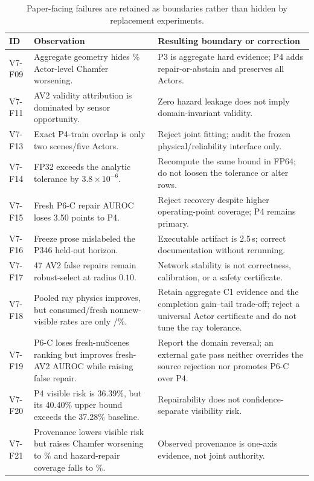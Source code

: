 \begin{table}[h]
\centering
\small
\caption{Paper-facing failures are retained as boundaries rather than hidden by replacement experiments.}
\begin{tabular}{p{}p{}p{}}
\toprule
ID & Observation & Resulting boundary or correction \\
\midrule
V7-F09 & Aggregate geometry hides \PthreeActorWorse{}\% Actor-level Chamfer worsening. & P3 is aggregate hard evidence; P4 adds repair-or-abstain and preserves all Actors. \\
V7-F11 & AV2 validity attribution is dominated by sensor opportunity. & Zero hazard leakage does not imply domain-invariant validity. \\
V7-F13 & Exact P4-train overlap is only two scenes/five Actors. & Reject joint fitting; audit the frozen physical/reliability interface only. \\
V7-F14 & FP32 exceeds the analytic tolerance by $3.8\times10^{-6}$. & Recompute the same bound in FP64; do not loosen the tolerance or alter rows. \\
V7-F15 & Fresh P6-C repair AUROC loses 3.50 points to P4. & Reject recovery despite higher operating-point coverage; P4 remains primary. \\
V7-F16 & Freeze prose mislabeled the P346 held-out horizon. & Executable artifact is 2.5\,s; correct documentation without rerunning. \\
V7-F17 & 47 AV2 false repairs remain robust-select at radius $0.10$. & Network stability is not correctness, calibration, or a safety certificate. \\
V7-F18 & Pooled ray physics improves, but consumed/fresh nonnew-visible rates are only \PthreeCNonnewActors{}/\PthreeFreshNonnewActors{}\%. & Retain aggregate C1 evidence and the completion gain--tail trade-off; reject a universal Actor certificate and do not tune the ray tolerance. \\
V7-F19 & P6-C loses fresh-nuScenes ranking but improves fresh-AV2 AUROC while raising false repair. & Report the domain reversal; an external gate pass neither overrides the source rejection nor promotes P6-C over P4. \\
V7-F20 & P4 visible risk is 36.39\%, but its 40.40\% upper bound exceeds the 37.28\% baseline. & Repairability does not confidence-separate visibility risk. \\
V7-F21 & Provenance lowers visible risk but raises Chamfer worsening to \PelevenDualChamferWorse{}\% and hazard-repair coverage falls to \PelevenDualHazardCoverage{}\%. & Observed provenance is one-axis evidence, not joint authority. \\

\end{tabular}
\end{table}
